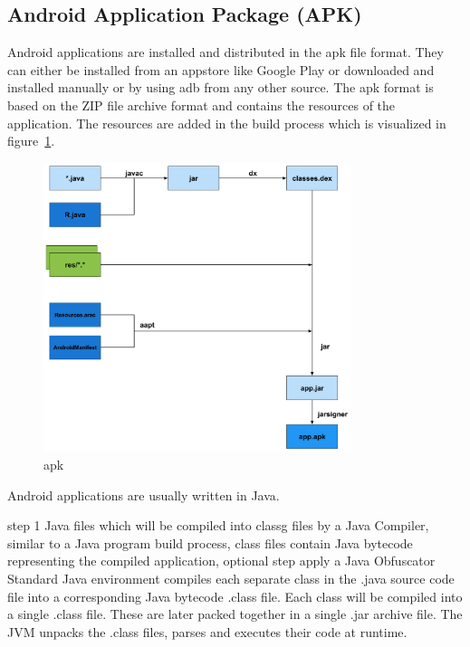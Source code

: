 \subsection{Android Application Package (APK)} \label{subsection:foundation-android-package}
Android applications are installed and distributed in the \gls{apk} file format.
They can either be installed from an appstore like Google Play or downloaded and installed manually or by using \gls{adb} from any other source.
\newline
The \gls{apk} format is based on the ZIP file archive format and contains the resources of the application. The resources are added in the build process which is visualized in figure~\ref{fig:apk}.
\begin{figure}[h]
    \centering
    \includegraphics[width=0.8\textwidth]{data/apk.png}
    \caption{apk \cite{andevconDalvikART}}
    \label{fig:apk}
\end{figure}
\newline
Android applications are usually written in Java.

step 1
Java files which will be compiled into \gls{classg} files by a Java Compiler,  similar to a Java program build process, class files contain Java bytecode representing the compiled application, optional step apply a Java Obfuscator\newline
Standard Java environment compiles each separate class in the .java source code file into a corresponding Java bytecode .class file. Each class will be compiled into a single .class file. These are later packed together in a single .jar archive file. The JVM unpacks the .class files, parses and executes their code at runtime.\newline

